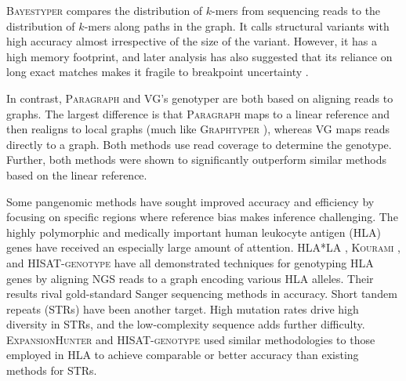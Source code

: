 \textsc{Bayestyper} \cite{sibbesen2018accurate} compares the distribution of $k$-mers from sequencing reads to the distribution of $k$-mers along paths in the graph.
It calls structural variants with high accuracy almost irrespective of the size of the variant.
However, it has a high memory footprint, and later analysis has also suggested that its reliance on long exact matches makes it fragile to breakpoint uncertainty \cite{hickey2019genotyping}.

In contrast, \textsc{Paragraph} \cite{chen2019paragraph} and \textsc{VG}'s genotyper \cite{hickey2019genotyping} are both based on aligning reads to graphs.
The largest difference is that \textsc{Paragraph} maps to a linear reference and then realigns to local graphs (much like \textsc{Graphtyper} \cite{eggertsson2017graphtyper}), whereas VG maps reads directly to a graph.
Both methods use read coverage to determine the genotype.
Further, both methods were shown to significantly outperform similar methods based on the linear reference.

Some pangenomic methods have sought improved accuracy and efficiency by focusing on specific regions where reference bias makes inference challenging. 
The highly polymorphic and medically important human leukocyte antigen (HLA) genes have received an especially large amount of attention.
\textsc{HLA*LA} \cite{dilthey2019hla}, \textsc{Kourami} \cite{lee2018kourami}, and \textsc{HISAT-genotype} \cite{Kim_2019} have all demonstrated techniques for genotyping HLA genes by aligning NGS reads to a graph encoding various HLA alleles.
Their results rival gold-standard Sanger sequencing methods in accuracy.
Short tandem repeats (STRs) have been another target.
High mutation rates drive high diversity in STRs, and the low-complexity sequence adds further difficulty.
\textsc{ExpansionHunter} \cite{dolzhenko2019expansionhunter} and \textsc{HISAT-genotype} \cite{Kim_2019} used similar methodologies to those employed in HLA to achieve comparable or better accuracy than existing methods for STRs.

%

